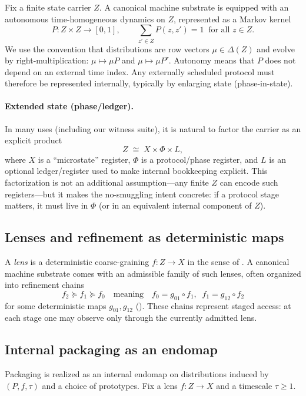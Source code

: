 \documentclass[11pt]{article}
\theoremstyle{definition}
\theoremstyle{remark}
\begin{document}
Fix a finite state carrier $Z$.
A canonical machine substrate is equipped with an autonomous time-homogeneous dynamics on $Z$, represented as a Markov kernel \citep{norris1997}
\[
P: Z\times Z \to [0,1],
\qquad
\sum_{z'\in Z} P(z,z') = 1 \;\;\text{for all }z\in Z.
\]
We use the convention that distributions are row vectors $\mu\in\Delta(Z)$ and evolve by right-multiplication:
$\mu \mapsto \mu P$ and $\mu \mapsto \mu P^\tau$.
Autonomy means that $P$ does not depend on an external time index.
Any externally scheduled protocol must therefore be represented internally, typically by enlarging state (phase-in-state).

\paragraph{Extended state (phase/ledger).}
In many uses (including our witness suite), it is natural to factor the carrier as an explicit product
\[
Z \;\cong\; X \times \Phi \times L,
\]
where $X$ is a ``microstate'' register, $\Phi$ is a protocol/phase register, and $L$ is an optional ledger/register used to make internal bookkeeping explicit.
This factorization is not an additional assumption---any finite $Z$ can encode such registers---but it makes the no-smuggling intent concrete:
if a protocol stage matters, it must live in $\Phi$ (or in an equivalent internal component of $Z$).

\subsection{Lenses and refinement as deterministic maps}

A \emph{lens} is a deterministic coarse-graining $f:Z\to X$ in the sense of .
A canonical machine substrate comes with an admissible family of such lenses, often organized into refinement chains
\[
f_2 \succeq f_1 \succeq f_0
\quad\text{meaning}\quad
f_0 = g_{01}\circ f_1,\;\; f_1 = g_{12}\circ f_2
\]
for some deterministic maps $g_{01},g_{12}$ ().
These chains represent staged access: at each stage one may observe only through the currently admitted lens.

\subsection{Internal packaging as an endomap}

Packaging is realized as an internal endomap on distributions induced by $(P,f,\tau)$ and a choice of prototypes.
Fix a lens $f:Z\to X$ and a timescale $\tau\ge 1$.
\end{document}
